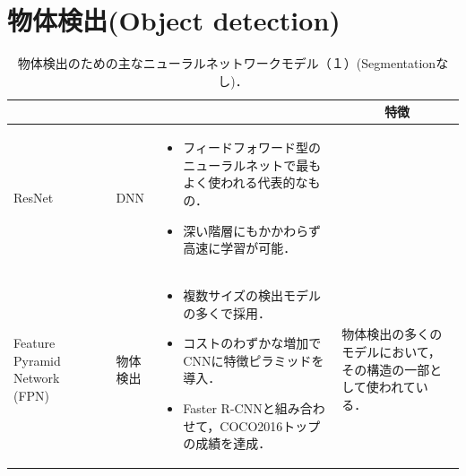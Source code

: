 \documentclass[originalpaper,fleqn]{jsaiart}     %
\begin{document}
\section{物体検出(Object detection)}
\begin{table}
    \caption{物体検出のための主なニューラルネットワークモデル（１）(Segmentationなし)．}
    \label{tbl-cheat1}
    \begin{center}
        \setlength{\tabcolsep}{3pt}
        \footnotesize
        \begin{tabularx}{\linewidth}{Xp{1.5cm}Xp{7cm}X} \toprule
            \centering{モデル名称} & \centering{文献} & \centering{用途} & \centering{概要} & \multicolumn{1}{c}{特徴} \\ \midrule

            ResNet & \cite{HZRS16} & DNN & 
            \begin{itemize}
                \vspace{-0.7\baselineskip}
                \setlength{\leftskip}{-3mm}
                \item フィードフォワード型のニューラルネットで最もよく使われる代表的なもの．
                \item  深い階層にもかかわらず高速に学習が可能．
            \end{itemize} &   \\
            
            Feature Pyramid Network (FPN) & \cite{LDGHHB17} & 物体検出 & 
            \begin{itemize}
                \vspace{-0.7\baselineskip}
                \setlength{\leftskip}{-3mm}
                \item 複数サイズの検出モデルの多くで採用．
                \item コストのわずかな増加でCNNに特徴ピラミッドを導入．
                \item Faster R-CNNと組み合わせて，COCO2016トップの成績を達成． 
            \end{itemize}
            & 物体検出の多くのモデルにおいて，その構造の一部として使われている．\\


\end{tabularx}
\end{center}
\end{table}
\end{document}
